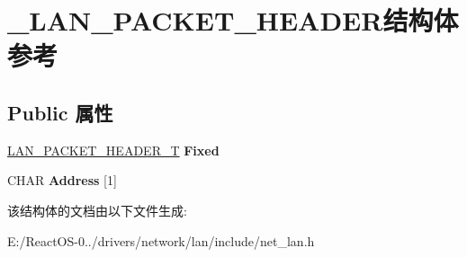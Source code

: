 \hypertarget{struct___l_a_n___p_a_c_k_e_t___h_e_a_d_e_r}{}\section{\+\_\+\+L\+A\+N\+\_\+\+P\+A\+C\+K\+E\+T\+\_\+\+H\+E\+A\+D\+E\+R结构体 参考}
\label{struct___l_a_n___p_a_c_k_e_t___h_e_a_d_e_r}
\subsection*{Public 属性}
\begin{DoxyCompactItemize}
\item 
\mbox{\label{struct___l_a_n___p_a_c_k_e_t___h_e_a_d_e_r_a488c5579aab8fee2787f2dd61dd5877c}} 
\hyperlink{struct___l_a_n___p_a_c_k_e_t___h_e_a_d_e_r___t}{L\+A\+N\+\_\+\+P\+A\+C\+K\+E\+T\+\_\+\+H\+E\+A\+D\+E\+R\+\_\+T} {\bfseries Fixed}
\item 
\mbox{\label{struct___l_a_n___p_a_c_k_e_t___h_e_a_d_e_r_a17450cba997a30a5edfdcdb67caa569e}} 
C\+H\+AR {\bfseries Address} \mbox{[}1\mbox{]}
\end{DoxyCompactItemize}


该结构体的文档由以下文件生成\+:\begin{DoxyCompactItemize}
\item 
E\+:/\+React\+O\+S-\/0../drivers/network/lan/include/net\+\_\+lan.\+h\end{DoxyCompactItemize}
